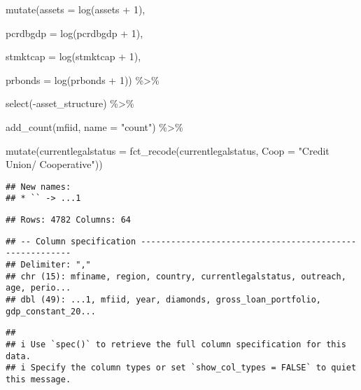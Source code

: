 \documentclass[a4paper,nobind]{templates/ociamthesis}
\newenvironment{Shaded}{\begin{snugshade}}{\end{snugshade}}
\newcommand{\AttributeTok}[1]{\textcolor[rgb]{0.77,0.63,0.00}{#1}}
\newcommand{\DecValTok}[1]{\textcolor[rgb]{0.00,0.00,0.81}{#1}}
\newcommand{\FunctionTok}[1]{\textcolor[rgb]{0.00,0.00,0.00}{#1}}
\newcommand{\NormalTok}[1]{#1}
\newcommand{\SpecialCharTok}[1]{\textcolor[rgb]{0.00,0.00,0.00}{#1}}
\newcommand{\StringTok}[1]{\textcolor[rgb]{0.31,0.60,0.02}{#1}}
\renewenvironment{Shaded}
{
  \vspace{10pt}%
  \begin{snugshade}%
}{%
  \end{snugshade}%
  \vspace{8pt}%
}
\begin{document}
\begin{Shaded}
\begin{Highlighting}[]
  \FunctionTok{mutate}\NormalTok{(}\AttributeTok{assets =} \FunctionTok{log}\NormalTok{(assets }\SpecialCharTok{+} \DecValTok{1}\NormalTok{),}
         
         \AttributeTok{pcrdbgdp =} \FunctionTok{log}\NormalTok{(pcrdbgdp }\SpecialCharTok{+} \DecValTok{1}\NormalTok{),}
         
         \AttributeTok{stmktcap =} \FunctionTok{log}\NormalTok{(stmktcap }\SpecialCharTok{+} \DecValTok{1}\NormalTok{),}
         
         \AttributeTok{prbonds =} \FunctionTok{log}\NormalTok{(prbonds }\SpecialCharTok{+} \DecValTok{1}\NormalTok{)) }\SpecialCharTok{\%\textgreater{}\%} 
  
  \FunctionTok{select}\NormalTok{(}\SpecialCharTok{{-}}\NormalTok{asset\_structure) }\SpecialCharTok{\%\textgreater{}\%} 
  
  \FunctionTok{add\_count}\NormalTok{(mfiid, }\AttributeTok{name =} \StringTok{"count"}\NormalTok{) }\SpecialCharTok{\%\textgreater{}\%} 
  
  \FunctionTok{mutate}\NormalTok{(}\AttributeTok{currentlegalstatus =} \FunctionTok{fct\_recode}\NormalTok{(currentlegalstatus, }\AttributeTok{Coop =} \StringTok{"Credit Union/ Cooperative"}\NormalTok{))}
\end{Highlighting}
\end{Shaded}

\begin{verbatim}
## New names:
## * `` -> ...1
\end{verbatim}

\begin{verbatim}
## Rows: 4782 Columns: 64
\end{verbatim}

\begin{verbatim}
## -- Column specification --------------------------------------------------------
## Delimiter: ","
## chr (15): mfiname, region, country, currentlegalstatus, outreach, age, perio...
## dbl (49): ...1, mfiid, year, diamonds, gross_loan_portfolio, gdp_constant_20...
\end{verbatim}

\begin{verbatim}
## 
## i Use `spec()` to retrieve the full column specification for this data.
## i Specify the column types or set `show_col_types = FALSE` to quiet this message.
\end{verbatim}
\end{document}
